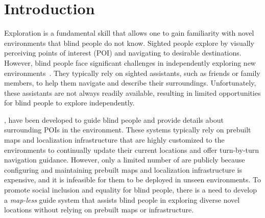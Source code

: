 


\section{Introduction}
Exploration is a fundamental skill that allows one to gain familiarity with novel environments that blind people do not know. 
Sighted people explore by visually perceiving points of interest (POI) and navigating to desirable destinations. 
However, blind people face significant challenges in independently exploring new environments~\cite{Engel2020travelling,muller2022traveling}. 
They typically rely on sighted assistants, such as friends or family members, to help them navigate and describe their surroundings.
Unfortunately, these assistants are not always readily available, resulting in limited opportunities for blind people to explore independently.

, have been developed to guide blind people and provide details about surrounding POIs in the environment. 
These systems typically rely on prebuilt maps and localization infrastructure 
that are highly customized to the environments to continually update their current locations and offer turn-by-turn navigation guidance.
However, only a limited number of  are publicly  because configuring and maintaining prebuilt maps and localization infrastructure is expensive, and it is infeasible for them to be deployed in unseen environments. 
To promote social inclusion and equality for blind people, there is a need to develop a \textit{map-less} guide system that assists blind people in exploring diverse novel locations without relying on prebuilt maps or infrastructure.

